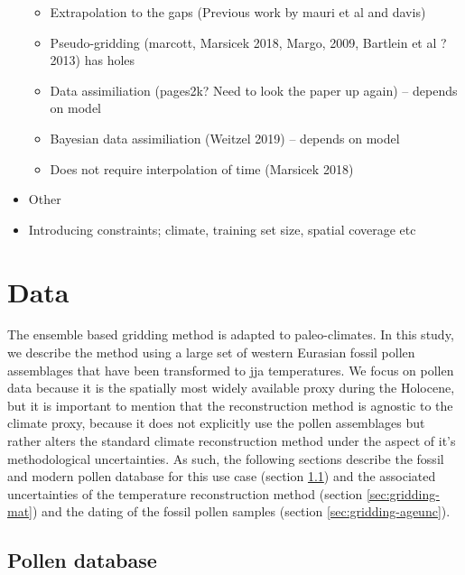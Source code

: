 \begin{refsection}
\begin{itemize}
\begin{itemize}
		\item Extrapolation to the gaps (Previous work by mauri et al and davis)
		\item Pseudo-gridding (marcott, Marsicek 2018, Margo, 2009, Bartlein et al ?2013) has holes
		\item Data assimiliation (pages2k? Need to look the paper up again) – depends on model
		\item Bayesian data assimiliation (Weitzel 2019) – depends on model
		\item Does not require interpolation of time (Marsicek 2018)
	\end{itemize}
	\item Other
	\item Introducing constraints; climate, training set size, spatial coverage etc
\end{itemize}


\section{Data}  \label{sec:gridding-data}

The ensemble based gridding method is adapted to paleo-climates. In this study, we describe the method using a large set of western Eurasian fossil pollen assemblages that have been transformed to \gls{jja} temperatures. We focus on pollen data because it is the spatially most widely available proxy during the Holocene, but it is important to mention that the reconstruction method is agnostic to the climate proxy, because it does not explicitly use the pollen assemblages but rather alters the standard climate reconstruction method under the aspect of it's methodological uncertainties. As such, the following sections describe the fossil and modern pollen database for this use case (section \ref{sec:gridding-polnet}) and the associated uncertainties of the temperature reconstruction method (section \ref{sec:gridding-mat}) and the dating of the fossil pollen samples (section \ref{sec:gridding-ageunc}).

\subsection{Pollen database}  \label{sec:gridding-polnet}


\end{refsection}
